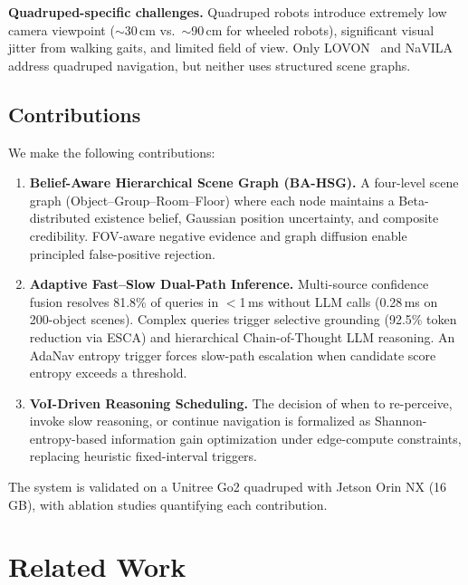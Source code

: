 \documentclass[conference]{IEEEtran}
\begin{document}
\textbf{Quadruped-specific challenges.}
Quadruped robots introduce extremely low camera viewpoint ($\sim$30\,cm vs.\ $\sim$90\,cm for wheeled robots), significant visual jitter from walking gaits, and limited field of view.
Only LOVON~\cite{lovon2025} and NaVILA~\cite{navila2025} address quadruped navigation, but neither uses structured scene graphs.

\subsection{Contributions}

We make the following contributions:

\begin{enumerate}[leftmargin=*]
\item \textbf{Belief-Aware Hierarchical Scene Graph (BA-HSG).}
A four-level scene graph (Object--Group--Room--Floor) where each node maintains a Beta-distributed existence belief, Gaussian position uncertainty, and composite credibility.
FOV-aware negative evidence and graph diffusion enable principled false-positive rejection.

\item \textbf{Adaptive Fast--Slow Dual-Path Inference.}
Multi-source confidence fusion resolves 81.8\% of queries in $<$1\,ms without LLM calls (0.28\,ms on 200-object scenes).
Complex queries trigger selective grounding (92.5\% token reduction via ESCA) and hierarchical Chain-of-Thought LLM reasoning.
An AdaNav entropy trigger forces slow-path escalation when candidate score entropy exceeds a threshold.

\item \textbf{VoI-Driven Reasoning Scheduling.}
The decision of when to re-perceive, invoke slow reasoning, or continue navigation is formalized as Shannon-entropy-based information gain optimization under edge-compute constraints, replacing heuristic fixed-interval triggers.
\end{enumerate}

The system is validated on a Unitree Go2 quadruped with Jetson Orin NX (16\,GB), with ablation studies quantifying each contribution.

\section{Related Work}
\label{sec:related}
\end{document}
